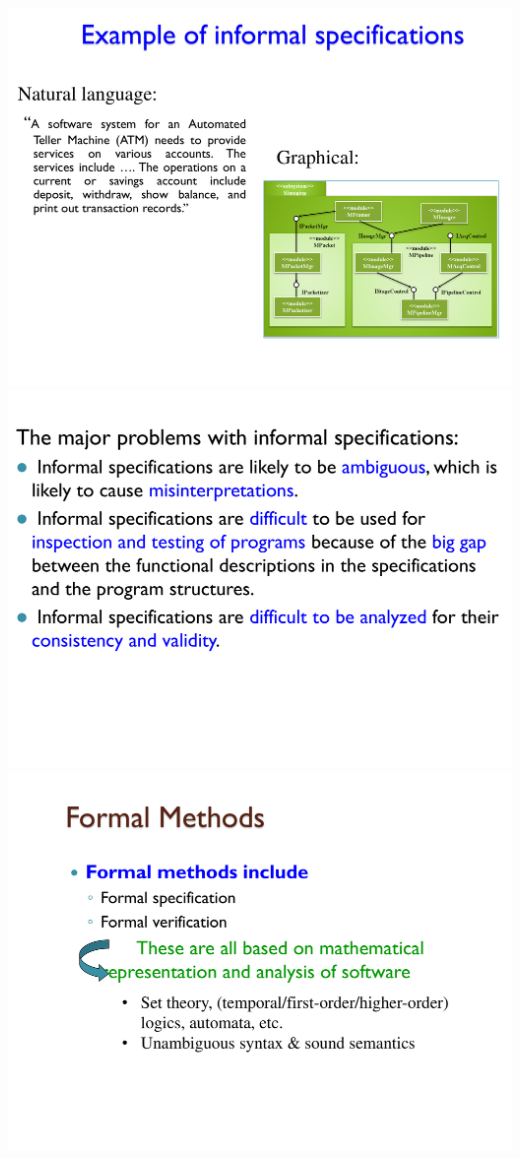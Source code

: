 \documentclass[a4paper]{article}
\begin{document}
\begin{multicols}{3}
        \includegraphics[width=\linewidth]{436.pdf}\\
        \includegraphics[width=\linewidth]{437.pdf}\\
        \includegraphics[width=\linewidth]{439.pdf}\\

\end{multicols}
\end{document}
